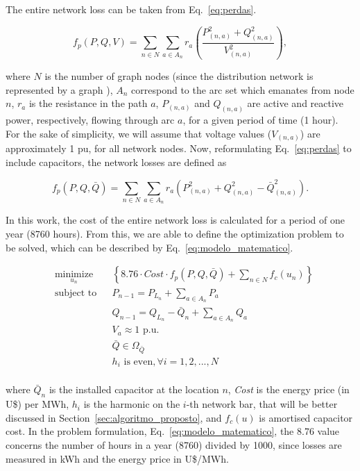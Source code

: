 \documentclass[11pt]{article}
\begin{document}
The entire network loss can be taken from Eq.~\ref{eq:perdas}.

\begin{equation}
f_p(P,Q,V) = \sum_{n \in N} \sum_{a \in A_n} r_a\left( \frac{P_{(n,a)}^2 + Q_{(n,a)}^2}{V_{(n,a)}^2}\right ),
\label{eq:perdas}
\end{equation}

\noindent where $N$ is the number of graph nodes (since the distribution network is represented
by a graph \citep{Cavellucci1997}), $A_n$ correspond to the arc set which emanates from node $n$, $r_a$ is the resistance 
in the path $a$, $P_{(n,a)}$ and $Q_{(n,a)}$ are active and reactive power, respectively,
flowing through arc $a$, for a given period of time (1 hour). For the sake of simplicity,
we will assume that voltage values ($V_{(n,a)}$) are approximately 1 pu, for all network nodes.
Now, reformulating Eq.~\ref{eq:perdas} to include capacitors, the network losses are defined as

\begin{equation}
 f_p(P,Q,\bar{Q}) = \sum_{n \in N} \sum_{a \in A_n} r_a (P_{(n,a)}^2 + Q_{(n,a)}^2 - \bar{Q}_{(n,a)}^2).
\label{eq:fp}
\end{equation}

In this work, the cost of the entire network loss is calculated for a period of
one year (8760 hours). From this, we are able to define the optimization
problem to be solved, which can be described by Eq.~\ref{eq:modelo_matematico}.

\begin{equation}
\begin{aligned}
& \underset{u_n}{\text{minimize}}
& & \left \{8.76\cdot Cost\cdot f_p(P,Q,\bar{Q}) + \sum_{n\in N} f_c(u_n) \right  \} \\
& \text{subject to}
&& P_{n-1}=P_{L_n} + \sum_{a \in A_n} P_{a} \\
&&& Q_{n-1}=Q_{L_n} - \bar{Q}_{n} + \sum_{a \in A_n} Q_{a} \\
&&& V_a \approx \textrm{1 p.u.} \\
&&& \bar{Q} \in \Omega_{\bar{Q}} \\
&&& h_i \text{ is even}, \forall i=1,2,...,N \\
\end{aligned}
\label{eq:modelo_matematico}
\end{equation}

\noindent where $\bar{Q}_{n}$ is the installed capacitor at the location $n$, {\it Cost} is the energy price
(in U\$) per MWh, $h_i$ is the harmonic on the $i$-th network bar, that will be better discussed in Section~\ref{sec:algoritmo_proposto},
and $f_c(u)$ is amortised capacitor cost. In the problem formulation, Eq.~\ref{eq:modelo_matematico}, the 8.76 value concerns
the number of hours in a year (8760) divided by 1000, since losses are measured
in kWh and the energy price in U\$/MWh.
\end{document}
